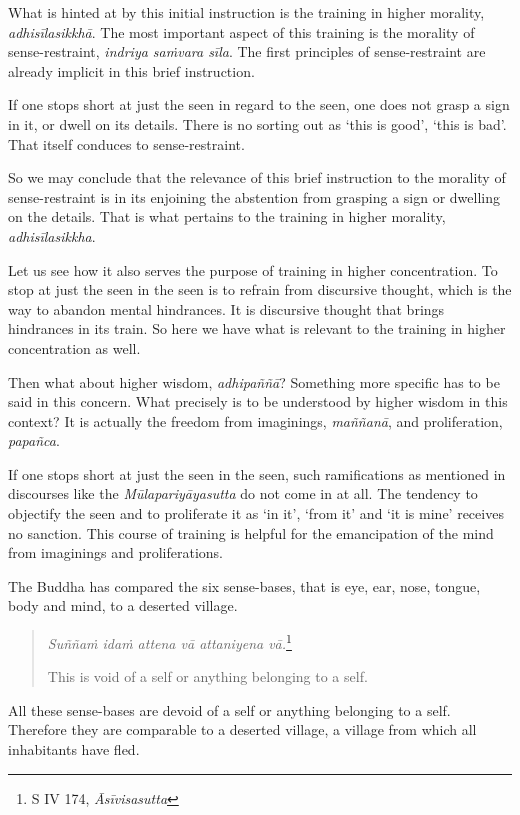 What is hinted at by this initial instruction is the training in higher morality, \emph{adhisīlasikkhā}. The most important aspect of this training is the morality of sense-restraint, \emph{indriya saṁvara sīla}. The first principles of sense-restraint are already implicit in this brief instruction.

If one stops short at just the seen in regard to the seen, one does not grasp a sign in it, or dwell on its details. There is no sorting out as `this is good', `this is bad'. That itself conduces to sense-restraint.

So we may conclude that the relevance of this brief instruction to the morality of sense-restraint is in its enjoining the abstention from grasping a sign or dwelling on the details. That is what pertains to the training in higher morality, \emph{adhisīlasikkha}.

Let us see how it also serves the purpose of training in higher concentration. To stop at just the seen in the seen is to refrain from discursive thought, which is the way to abandon mental hindrances. It is discursive thought that brings hindrances in its train. So here we have what is relevant to the training in higher concentration as well.

Then what about higher wisdom, \emph{adhipaññā}? Something more specific has to be said in this concern. What precisely is to be understood by higher wisdom in this context? It is actually the freedom from imaginings, \emph{maññanā}, and proliferation, \emph{papañca}.

If one stops short at just the seen in the seen, such ramifications as mentioned in discourses like the \emph{Mūlapariyāyasutta} do not come in at all. The tendency to objectify the seen and to proliferate it as `in it', `from it' and `it is mine' receives no sanction. This course of training is helpful for the emancipation of the mind from imaginings and proliferations.

The Buddha has compared the six sense-bases, that is eye, ear, nose, tongue, body and mind, to a deserted village.

\begin{quote}
\emph{Suññaṁ idaṁ attena vā attaniyena vā.}\footnote{S IV 174, \emph{Āsīvisasutta}}

This is void of a self or anything belonging to a self.
\end{quote}

All these sense-bases are devoid of a self or anything belonging to a self. Therefore they are comparable to a deserted village, a village from which all inhabitants have fled.

